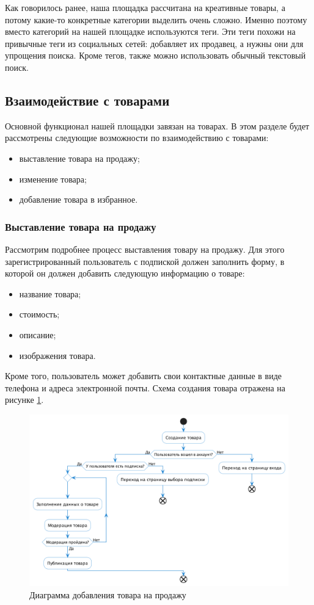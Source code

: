 \documentclass[a4paper,14pt]{extarticle}
\begin{document}
Как говорилось ранее, наша площадка рассчитана на креативные товары, а потому какие-то конкретные категории выделить очень сложно. Именно поэтому вместо категорий на нашей площадке используются теги. Эти теги похожи на привычные теги из социальных сетей: добавляет их продавец, а нужны они для упрощения поиска. Кроме тегов, также можно использовать обычный текстовый поиск.

\subsection{Взаимодействие с товарами}

Основной функционал нашей площадки завязан на товарах. В этом разделе будет рассмотрены следующие возможности по взаимодействию с товарами:
\begin{itemize}
    \item выставление товара на продажу;
    \item изменение товара;
    \item добавление товара в избранное.
\end{itemize}

\subsubsection*{Выставление товара на продажу}

Рассмотрим подробнее процесс выставления товару на продажу. Для этого зарегистрированный пользователь с подпиской должен заполнить форму, в которой он должен добавить следующую информацию о товаре:
\begin{itemize}
    \item название товара;
    \item стоимость;
    \item описание;
    \item изображения товара.
\end{itemize}
Кроме того, пользователь может добавить свои контактные данные в виде телефона и адреса электронной почты. Схема создания товара отражена на рисунке \ref{fig:add_item}.

\begin{figure}[H]
    \centering
    \includegraphics[width=\textwidth]{images/add_item.png}
    \caption{Диаграмма добавления товара на продажу}
    \label{fig:add_item}
\end{figure}
\end{document}
